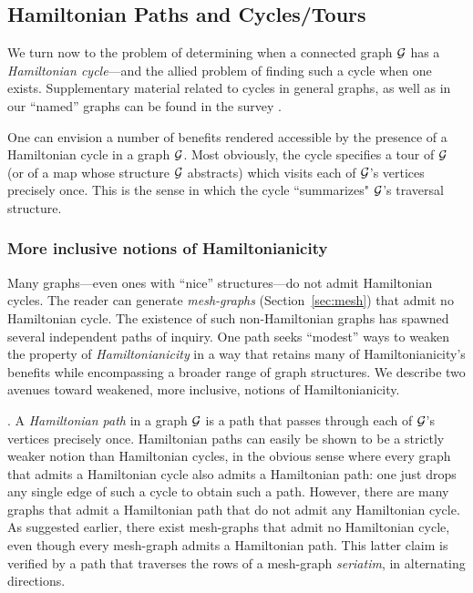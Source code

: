 
\subsection{Hamiltonian Paths and Cycles/Tours}
\label{sec:Hamiltonian-cycle}

We turn now to the problem of determining when a connected graph $\mbox{$\cal G$}$ has a
{\it Hamiltonian cycle}---and the allied problem of finding such a cycle when one exists.
Supplementary material related to cycles in general graphs, as well as in our ``named'' 
graphs can be found in the survey \cite{Rosenberg91}.

One can envision a number of benefits rendered accessible by the
presence of a Hamiltonian cycle in a graph $\mbox{$\cal G$}$.  Most obviously, the
cycle specifies a tour of $\mbox{$\cal G$}$ (or of a map whose structure $\mbox{$\cal G$}$
abstracts) which visits each of $\mbox{$\cal G$}$'s vertices precisely once.  This
is the sense in which the cycle ``summarizes" $\mbox{$\cal G$}$'s traversal structure.

\subsubsection{More inclusive notions of Hamiltonianicity}

Many graphs---even ones with ``nice'' structures---do not admit
Hamiltonian cycles.  The reader can generate {\it mesh-graphs}
(Section~\ref{sec:mesh}) that admit no Hamiltonian cycle.  The
existence of such non-Hamiltonian graphs has spawned several
independent paths of inquiry.  One path seeks ``modest'' ways to
weaken the property of {\it Hamiltonianicity}
 in a way that retains many of
Hamiltonianicity's benefits while encompassing a broader range of
graph structures.  We describe two avenues toward weakened, more
inclusive, notions of Hamiltonianicity.

.
A {\it Hamiltonian path} 
 in a graph $\mbox{$\cal G$}$ is a path that passes through
each of $\mbox{$\cal G$}$'s vertices precisely once.  Hamiltonian paths can easily be
shown to be a strictly weaker notion than Hamiltonian cycles, in the
obvious sense where every graph that admits a Hamiltonian
cycle also admits a Hamiltonian path: one just drops any single edge
of such a cycle to obtain such a path.  However, there are many graphs
that admit a Hamiltonian path that do not admit any Hamiltonian cycle.
As suggested earlier, there exist mesh-graphs that admit no
Hamiltonian cycle, even though every mesh-graph admits a Hamiltonian
path.  This latter claim is verified by a path that traverses the rows
of a mesh-graph {\it seriatim}, in alternating directions.

